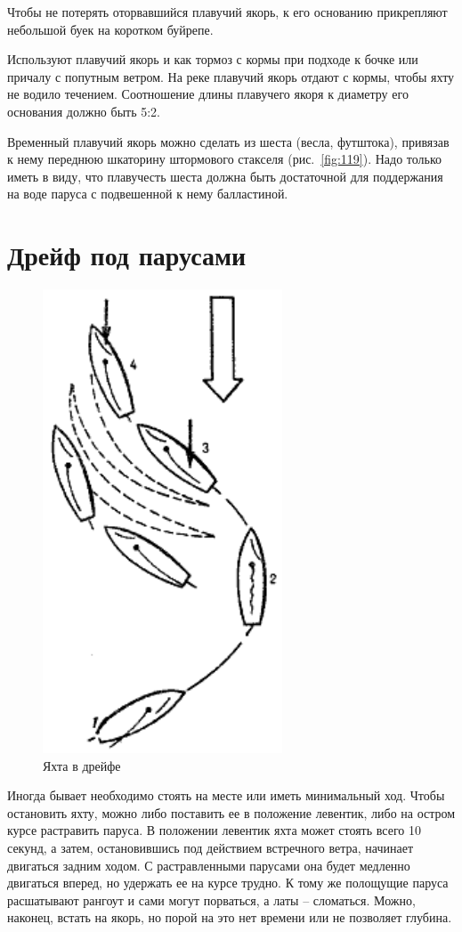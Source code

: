\documentclass[a4paper, 12pt, twoside, final]{scrbook}
\begin{document}
Чтобы не потерять оторвавшийся плавучий якорь, к его основанию прикрепляют небольшой буек на коротком буйрепе.

Используют плавучий якорь и как тормоз с кормы при подходе к бочке или причалу с попутным ветром. На реке плавучий якорь отдают с кормы, чтобы яхту не водило течением. Соотношение длины плавучего якоря к диаметру его основания должно быть 5:2.

Временный плавучий якорь можно сделать из шеста (весла, футштока), привязав к нему переднюю шкаторину штормового стакселя (рис.~\ref{fig:119}). Надо только иметь в виду, что плавучесть шеста должна быть достаточной для поддержания на воде паруса с подвешенной к нему балластиной.

\section{Дрейф под парусами}

\begin{figure}
	\centering
	\includegraphics[scale=1]{120_Yakhta_v_drejfe}
	\caption{Яхта в дрейфе}
	\label{fig:120}
\end{figure}

Иногда бывает необходимо стоять на месте или иметь минимальный ход. Чтобы остановить яхту, можно либо поставить ее в положение левентик, либо на остром курсе растравить паруса. В положении левентик яхта может стоять всего 10 секунд, а затем, остановившись под действием встречного ветра, начинает двигаться задним ходом. С растравленными парусами она будет медленно двигаться вперед, но удержать ее на курсе трудно. К тому же полощущие паруса расшатывают рангоут и сами могут порваться, а латы \--- сломаться. Можно, наконец, встать на якорь, но порой на это нет времени или не позволяет глубина.
\end{document}
